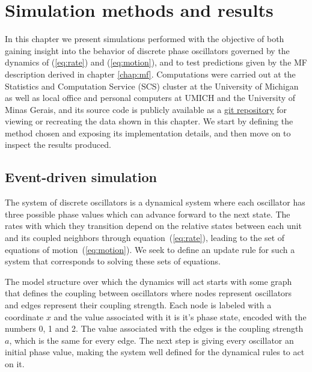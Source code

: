 \chapter{Simulation methods and results}
\label{chap:simulation}

In this chapter we present simulations performed with the objective of both gaining insight into the behavior of discrete phase
oscillators governed by the dynamics of (\ref{eq:rate}) and (\ref{eq:motion}), and to test predictions given by the  MF description
derived in chapter \ref{chap:mf}.  Computations were carried out at the Statistics and Computation Service (SCS) cluster at the
University of Michigan as well as local office and personal computers at UMICH and the University of Minas Gerais, and its source code
is publicly available as a \href{https://github.com/KiloLiuton/event-driven-cpp-minimalist}{git repository}\footnotemark{} for viewing
or recreating the data shown in this chapter. We start by defining the method chosen and exposing its implementation details, and then
move on to inspect the results produced.


\section{Event-driven simulation}

The system of discrete oscillators is a dynamical system where each oscillator has three possible phase values which can advance
forward to the next state. The rates with which they transition depend on the relative states between each unit and its coupled
neighbors through equation~(\ref{eq:rate}), leading to the set of equations of motion~(\ref{eq:motion}). We seek to define an update
rule for such a system that corresponds to solving these sets of equations.

The model structure over which the dynamics will act starts with some graph that defines the coupling between oscillators where nodes
represent oscillators and edges represent their coupling strength. Each node is labeled with a coordinate $x$ and the value associated
with it is it's phase state, encoded with the numbers 0, 1 and 2. The value associated with the edges is the coupling strength $a$,
which is the same for every edge. The next step is giving every oscillator an initial phase value, making the system well defined for
the dynamical rules to act on it.

